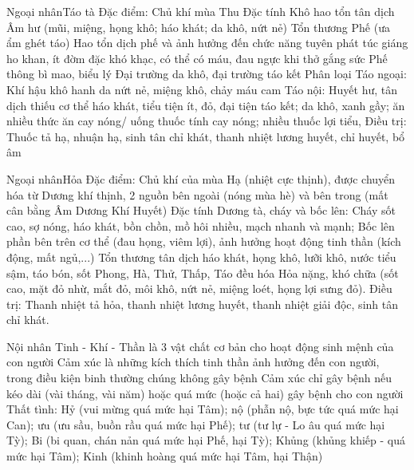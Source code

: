 \documentclass[
	11pt, %
]{beamer}
\theoremstyle{newblock}
\begin{document}
\begin{frame}{Ngoại nhân}{Táo tà}
	Đặc điểm: Chủ khí mùa Thu
	Đặc tính
	Khô  hao tổn tân dịch  Âm hư (mũi, miệng, họng khô; háo khát; da khô, nứt nẻ)
	Tổn thương Phế (ưa ẩm ghét táo)  Hao tổn dịch phế và ảnh hưởng đến chức năng tuyên phát  túc giáng  ho khan, ít đờm đặc khó khạc, có thể có máu, đau ngực khi thở gắng sức
	Phế thông bì mao, biểu lý Đại trường  da khô, đại trường táo kết
	Phân loại
	Táo ngoại: Khí hậu khô hanh  da nứt nẻ, miệng khô, chảy máu cam
	Táo nội: Huyết hư, tân dịch thiếu  cơ thể háo khát, tiểu tiện ít, đỏ, đại tiện táo kết; da khô, xanh gầy; ăn nhiều thức ăn cay nóng/ uống thuốc tính cay nóng; nhiều thuốc lợi tiểu,
	Điều trị: Thuốc tả hạ, nhuận hạ, sinh tân chỉ khát, thanh nhiệt lương huyết, chỉ huyết, bổ âm

\end{frame}
\begin{frame}{Ngoại nhân}{Hỏa}
	Đặc điểm: Chủ khí của mùa Hạ (nhiệt cực thịnh), được chuyển hóa từ Dương khí 	thịnh, 2 nguồn bên ngoài (nóng mùa hè) và bên trong (mất cân bằng Âm Dương 	Khí Huyết)
Đặc tính
Dương tà, cháy và bốc lên: Cháy  sốt cao, sợ nóng, háo khát, bồn chồn, mồ hôi nhiều, mạch nhanh và mạnh; Bốc lên  phần bên trên cơ thể (đau họng, viêm lợi), ảnh hưởng hoạt động tinh thần (kích động, mất ngủ,...)
Tổn thương tân dịch  háo khát, họng khô, lưỡi khô, nước tiểu sậm, táo bón, sốt
Phong, Hà, Thử, Thấp, Táo đều hóa Hỏa  nặng, khó chữa (sốt cao, mặt đỏ nhừ, mắt đỏ, môi khô, nứt nẻ, miệng loét, họng lợi sưng đỏ).
Điều trị: Thanh nhiệt tả hỏa, thanh nhiệt lương huyết, thanh nhiệt giải độc, sinh tân 	chỉ khát.
\end{frame}
\begin{frame}{Nội nhân}
	Tinh - Khí - Thần là 3 vật chất cơ bản cho hoạt động sinh mệnh của con người
Cảm xúc là những kích thích tinh thần ảnh hưởng đến con người, trong điều kiện binh thường chúng không gây bệnh
Cảm xúc chỉ gây bệnh nếu kéo dài (vài tháng, vài năm) hoặc quá mức (hoặc cả hai)  gây bệnh cho con người
Thất tình: Hỷ (vui mừng  quá mức  hại Tâm); nộ (phẫn nộ, bực tức  quá mức  hại Can); ưu (ưu sầu, buồn rầu
 quá mức  hại Phế); tư (tư lự -  Lo âu  quá mức  hại Tỳ); Bi (bi quan, chán nản  quá mức  hại Phế, hại Tỳ); Khủng (khủng khiếp - quá mức  hại Tâm); Kinh (khinh hoàng  quá mức  hại Tâm, hại Thận)
\end{frame}
\end{document}
